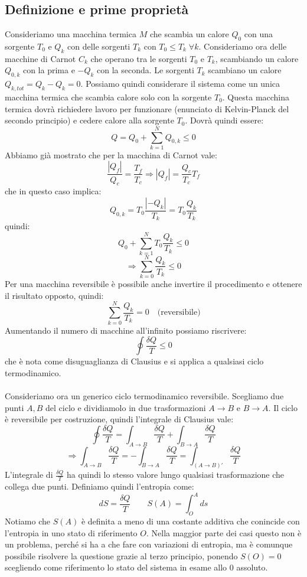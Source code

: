 \documentclass{article}
\begin{document}
\subsection{Definizione e prime proprietà}
Consideriamo una macchina termica $M$ che scambia un calore $Q_0$ con una sorgente $T_0$ e $Q_k$ con delle sorgenti $T_k$ con $T_0\leq T_k\;\forall k$. Consideriamo ora delle macchine di Carnot $C_k$ che operano tra le sorgenti $T_0$ e $T_k$, scambiando un calore $Q_{0,k}$ con la prima e $-Q_k$ con la seconda. Le sorgenti $T_k$ scambiano un calore $Q_{k,tot}=Q_k-Q_k=0$. Possiamo quindi considerare il sistema come un unica macchina termica che scambia calore solo con la sorgente $T_0$. Questa macchina termica dovrà richiedere lavoro per funzionare (enunciato di Kelvin-Planck del secondo principio) e cedere calore alla sorgente $T_0$. Dovrà quindi essere:
$$ Q=Q_0+\sum_{k=1}^{N}Q_{0,k}\leq0 $$
Abbiamo già mostrato che per la macchina di Carnot vale:
$$ \frac{|Q_f|}{Q_c} = \frac{T_f}{T_c} \Rightarrow |Q_f| = \frac{Q_c}{T_c}T_f $$
che in questo caso implica:
$$ Q_{0,k}=T_0\frac{|-Q_k|}{T_k}=T_0\frac{Q_k}{T_k} $$
quindi:
$$ Q_0+\sum_{k=1}^{N}T_0\frac{Q_k}{T_k}\leq0$$
$$ \Rightarrow\sum_{k=0}^{N}\frac{Q_k}{T_k}\leq0 $$
Per una macchina reversibile è possibile anche invertire il procedimento e ottenere il risultato opposto, quindi:
$$ \sum_{k=0}^{N}\frac{Q_k}{T_k}=0\quad\text{(reversibile)} $$
Aumentando il numero di macchine all'infinito possiamo riscrivere:
$$ \oint\frac{\delta Q}{T}\leq 0 $$
che è nota come disuguaglianza di Clausius e si applica a qualsiasi ciclo termodinamico.\\\\
Consideriamo ora un generico ciclo termodinamico reversibile. Scegliamo due punti $A,B$ del ciclo e dividiamolo in due trasformazioni $A\rightarrow B$ e $B\rightarrow A$. Il ciclo è reversibile per costruzione, quindi l'integrale di Clausius vale:
$$ \oint\frac{\delta Q}{T} = \int_{A\rightarrow B}\frac{\delta Q}{T}+\int_{B\rightarrow A}\frac{\delta Q}{T} $$
$$ \Rightarrow \int_{A\rightarrow B}\frac{\delta Q}{T} = -\int_{B\rightarrow A}\frac{\delta Q}{T} = \int_{(A\rightarrow B)'}\frac{\delta Q}{T}$$
L'integrale di $\frac{\delta Q}{T}$ ha quindi lo stesso valore lungo qualsiasi trasformazione che collega due punti. Definiamo quindi l'entropia come:
$$dS=\frac{\delta Q}{T} \qquad S(A)=\int_{O}^{A}ds$$
Notiamo che $S(A)$ è definita a meno di una costante additiva che conincide con l'entropia in uno stato di riferimento $O$. Nella maggior parte dei casi questo non è un problema, perché si ha a che fare con variazioni di entropia, ma è comunque possibile risolvere la questione grazie al terzo principio, ponendo $S(O)=0$ scegliendo come riferimento lo stato del sistema in esame allo 0 assoluto.\\\\
\end{document}
